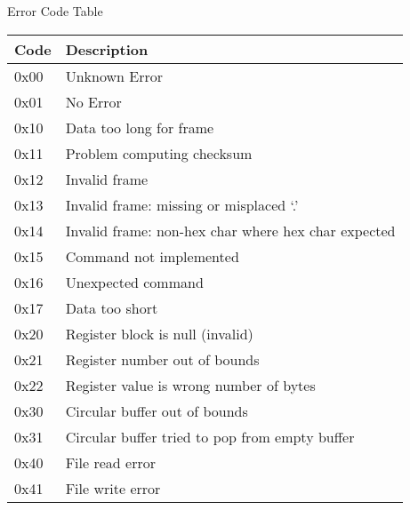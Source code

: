 \documentclass{customdocclass}
\begin{document}
\begin{center}
\small
Error Code Table
\begin{tabularx}{\textwidth}{|l|X|} \hline
Code & Description \\ \hline
0x00 & Unknown Error \\ \hline
0x01 & No Error \\ \hline
0x10 & Data too long for frame \\ \hline
0x11 & Problem computing checksum \\ \hline
0x12 & Invalid frame \\ \hline
0x13 & Invalid frame: missing or misplaced `.' \\ \hline
0x14 & Invalid frame: non-hex char where hex char expected \\ \hline
0x15 & Command not implemented \\ \hline
0x16 & Unexpected command \\ \hline
0x17 & Data too short \\ \hline
0x20 & Register block is null (invalid) \\ \hline
0x21 & Register number out of bounds \\ \hline
0x22 & Register value is wrong number of bytes \\ \hline
0x30 & Circular buffer out of bounds \\ \hline
0x31 & Circular buffer tried to pop from empty buffer \\ \hline
0x40 & File read error \\ \hline
0x41 & File write error \\ \hline
\end{tabularx}
\end{center}
\end{document}
